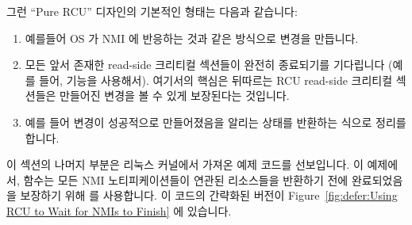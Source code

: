 그런 ``Pure RCU'' 디자인의 기본적인 형태는 다음과 같습니다:

\begin{enumerate}
\item	예를들어 OS 가 NMI 에 반응하는 것과 같은 방식으로 변경을 만듭니다.
\item	모든 앞서 존재한 read-side 크리티컬 섹션들이 완전히 종료되기를
	기다립니다 (예를 들어,  기능을 사용해서).
	여기서의 핵심은 뒤따르는 RCU read-side 크리티컬 섹션들은 만들어진
	변경을 볼 수 있게 보장된다는 것입니다.
\item	예를 들어 변경이 성공적으로 만들어졌음을 알리는 상태를 반환하는 식으로
	정리를 합니다.

\end{enumerate}

이 섹션의 나머지 부분은 리눅스 커널에서 가져온 예제 코드를 선보입니다.
이 예제에서,  함수는 모든 NMI 노티피케이션들이 연관된 리소스들을
반환하기 전에 완료되었음을 보장하기 위해  를
사용합니다.
이 코드의 간략화된 버전이
Figure~\ref{fig:defer:Using RCU to Wait for NMIs to Finish} 에 있습니다.

